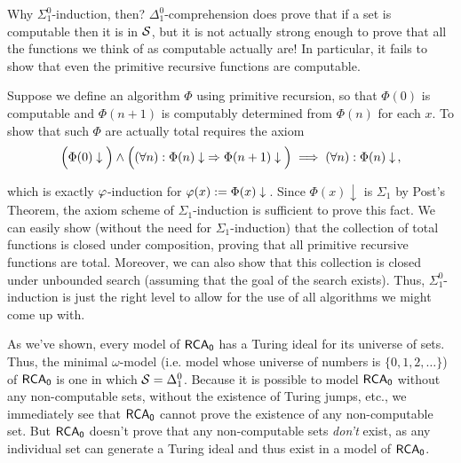 \documentclass{amsart}
\begin{document}
	Why $\Sigma_1^0$-induction, then? $\Delta_1^0$-comprehension does prove that if a set is computable then it is in $\mathcal{S}$, but it is not actually strong enough to prove that all the functions we think of as computable actually are! In particular, it fails to show that even the primitive recursive functions are computable.
	
	\indent Suppose we define an algorithm $\Phi$ using primitive recursion, so that $\Phi(0)$ is computable and $\Phi(n+1)$ is computably determined from $\Phi(n)$ for each $x$. To show that such $\Phi$ are actually total requires the axiom
	$$
	\Big(\Phi(0)\downarrow \Big) \wedge \Big( (\forall n): \Phi(n)\downarrow \; \Rightarrow \Phi(n+1)\downarrow\Big) \implies (\forall n): \Phi(n)\downarrow \,,
	$$
	\begin{samepage}which is exactly $\varphi$-induction for $\varphi(x):=\Phi(x)\downarrow\,$. Since $\Phi(x)\downarrow$ is $\Sigma_1$ by Post's Theorem, the axiom scheme of $\Sigma_1$-induction is sufficient to prove this fact. We can easily show (without the need for $\Sigma_1$-induction) that the collection of total functions is closed under composition, proving that all primitive recursive functions are total. Moreover, we can also show that this collection is closed under unbounded search (assuming that the goal of the search exists). Thus, $\Sigma_1^0$-induction is just the right level to allow for the use of all algorithms we might come up with.\end{samepage}
	
	As we've shown, every model of $\operatorname{\sf{RCA_0}}$ has a Turing ideal for its universe of sets. Thus, the minimal $\omega$-model (i.e. model whose universe of numbers is $\{0,1,2,\dots\}$) of $\operatorname{\sf{RCA_0}}$ is one in which $\mathcal{S}=\Delta_1^0$. Because it is possible to model $\operatorname{\sf{RCA_0}}$ without any non-computable sets, without the existence of Turing jumps, etc., we immediately see that $\operatorname{\sf{RCA_0}}$ cannot prove the existence of any non-computable set. But $\operatorname{\sf{RCA_0}}$ doesn't prove that any non-computable sets \textit{don't} exist, as any individual set can generate a Turing ideal and thus exist in a model of $\operatorname{\sf{RCA_0}}$.\\
	
	
	
	
\end{document}
